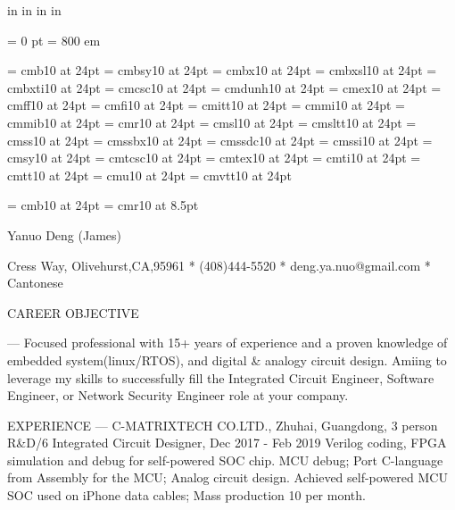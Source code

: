 \nopagenumbers

 in     %
 in    %
 in  %
 in  %

\parindent = 0 pt
\emergencystretch = 800 em


\font\FFcmb=      cmb10            at 24pt
\font\FFcmbsy=    cmbsy10          at 24pt
\font\FFcmbx=     cmbx10           at 24pt
\font\FFcmbxsl=   cmbxsl10         at 24pt
\font\FFcmbxti=   cmbxti10         at 24pt
\font\FFcmcsc=    cmcsc10          at 24pt
\font\FFcmdunh=   cmdunh10         at 24pt
\font\FFcmex=     cmex10           at 24pt
\font\FFcmff=     cmff10           at 24pt
\font\FFcmfi=     cmfi10           at 24pt
\font\FFcmitt=    cmitt10          at 24pt
\font\FFcmmi=     cmmi10           at 24pt
\font\FFcmmib=    cmmib10          at 24pt
\font\FFcmr=      cmr10            at 24pt
\font\FFcmsl=     cmsl10           at 24pt
\font\FFcmsltt=   cmsltt10         at 24pt
\font\FFcmss=     cmss10           at 24pt
\font\FFcmssbx=   cmssbx10         at 24pt
\font\FFcmssdc=   cmssdc10         at 24pt
\font\FFcmssi=    cmssi10          at 24pt
\font\FFcmsy=     cmsy10           at 24pt
\font\FFcmtcsc=   cmtcsc10         at 24pt
\font\FFcmtex=    cmtex10          at 24pt
\font\FFcmti=     cmti10           at 24pt
\font\FFcmtt=     cmtt10           at 24pt
\font\FFcmu=      cmu10            at 24pt
\font\FFcmvtt=    cmvtt10          at 24pt

\font\FFaa=      cmb10            at 24pt
\font\FFbb=      cmr10            at 8.5pt

\centerline{ \FFaa
Yanuo Deng (James)
}

\centerline{  Cress Way, Olivehurst,CA,95961
*
(408)444-5520
*
deng.ya.nuo@gmail.com
*
Cantonese
}


{ \FFbb
CAREER OBJECTIVE
}

---
Focused professional with 15+ years of experience and a proven knowledge of embedded system(linux/RTOS), and digital \& analogy circuit design. Amiing to leverage my skills to successfully fill the Integrated Circuit Engineer, Software Engineer, or Network Security Engineer role at your company.

EXPERIENCE
---
C-MATRIXTECH CO.LTD., Zhuhai, Guangdong, 3 person R\&D/6
Integrated Circuit Designer, Dec 2017 - Feb 2019
 Verilog coding, FPGA simulation and debug for self-powered SOC chip. 
 MCU debug; Port C-language from Assembly for the MCU; Analog circuit design.
 Achieved self-powered MCU SOC used on iPhone data cables; Mass production 10 per month.

